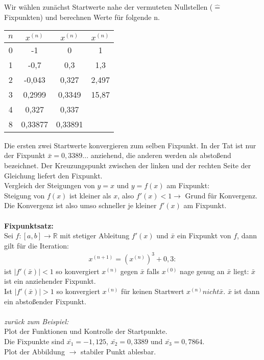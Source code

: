 \documentclass{scrartcl}
\begin{document}
Wir wählen zunächst Startwerte nahe der vermuteten Nullstellen ($\hat{=}$ Fixpunkten) und berechnen Werte für folgende n.\\
\begin{center}
\begin{tabular}{|c|c|c|c|}
\hline 
$n$ & $x^{(n)}$ & $x^{(n)}$ & $x^{(n)}$ \\ 
\hline 
0 & -1 & 0 & 1 \\ 

1 & -0,7 & 0,3 & 1,3 \\ 

2 & -0,043 & 0,327 & 2,497 \\ 

3 & 0,2999 & 0,3349 & 15,87 \\ 

4 & 0,327 & 0,337 &  \\ 

8 & 0,33877 & 0,33891 &  \\ 
\hline 
\end{tabular} 
\end{center}
Die ersten zwei Startwerte konvergieren zum selben Fixpunkt.
In der Tat ist nur der Fixpunkt $\bar{x}=0,3389...$ anziehend, die anderen werden als abstoßend bezeichnet.
Der Kreuzungspunkt zwischen der linken und der rechten Seite der Gleichung liefert den Fixpunkt.\\
Vergleich der Steigungen  von $y=x$ und $y=f(x)$ am Fixpunkt:\\
Steigung von $f(x)$ ist kleiner als $x$, also $f'(x)<1 \rightarrow$ Grund für Konvergenz.
Die Konvergenz ist also umso schneller je kleiner $f'(x)$ am Fixpunkt.\\
\\
\textbf{Fixpunktsatz:}\\ 
Sei $f:[a,b]\rightarrow \mathbb{R}$ mit stetiger Ableitung $f'(x)$ und $\bar{x}$ ein Fixpunkt von $f$, dann gilt für die Iteration:
\begin{align*}
x^{(n+1)}=(x^{(n)})^3+0,3:
\end{align*}
ist $|f'(\bar{x})|<1$ so konvergiert $x^{(n)}$ gegen $\bar{x}$ falls $x^{(0)}$ nage genug an $\bar{x}$ liegt: $\bar{x}$ ist ein anziehender Fixpunkt.\\
Ist $|f'(\bar{x})|>1$ so konvergiert $x^{(n)}$ für keinen Startwert $x^{(n)} nicht \bar{x} $. $\bar{x}$ ist dann ein abstoßender Fixpunkt.
\\
\\
\textit{zurück zum Beispiel:}\\
Plot der Funktionen und Kontrolle der Startpunkte.\\
Die Fixpunkte sind $\bar{x_1}=-1,125$, $\bar{x_2}=0,3389$ und $\bar{x_3}=0,7864$.\\
Plot der Abbildung $\rightarrow$ stabiler Punkt ablesbar.
\end{document}
